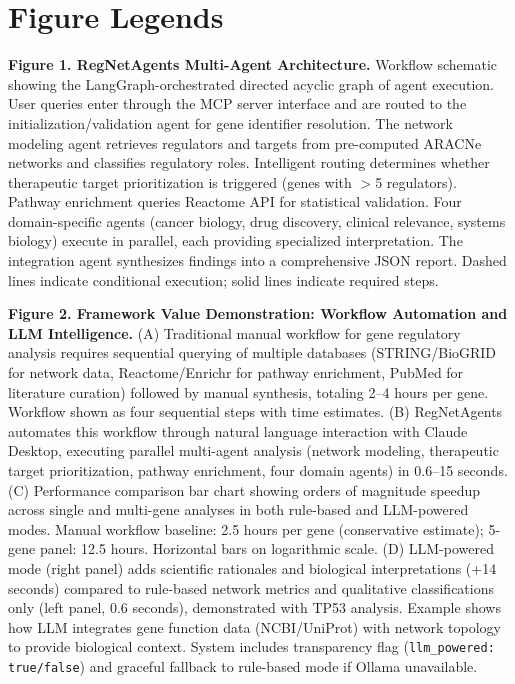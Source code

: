 \documentclass[11pt]{article}
\begin{document}
\section*{Figure Legends}

\textbf{Figure 1. RegNetAgents Multi-Agent Architecture.}
Workflow schematic showing the LangGraph-orchestrated directed acyclic graph of agent execution. User queries enter through the MCP server interface and are routed to the initialization/validation agent for gene identifier resolution. The network modeling agent retrieves regulators and targets from pre-computed ARACNe networks and classifies regulatory roles. Intelligent routing determines whether therapeutic target prioritization is triggered (genes with $>$5 regulators). Pathway enrichment queries Reactome API for statistical validation. Four domain-specific agents (cancer biology, drug discovery, clinical relevance, systems biology) execute in parallel, each providing specialized interpretation. The integration agent synthesizes findings into a comprehensive JSON report. Dashed lines indicate conditional execution; solid lines indicate required steps.

\textbf{Figure 2. Framework Value Demonstration: Workflow Automation and LLM Intelligence.}
(A) Traditional manual workflow for gene regulatory analysis requires sequential querying of multiple databases (STRING/BioGRID for network data, Reactome/Enrichr for pathway enrichment, PubMed for literature curation) followed by manual synthesis, totaling 2--4 hours per gene. Workflow shown as four sequential steps with time estimates. (B) RegNetAgents automates this workflow through natural language interaction with Claude Desktop, executing parallel multi-agent analysis (network modeling, therapeutic target prioritization, pathway enrichment, four domain agents) in 0.6--15 seconds. (C) Performance comparison bar chart showing orders of magnitude speedup across single and multi-gene analyses in both rule-based and LLM-powered modes. Manual workflow baseline: 2.5 hours per gene (conservative estimate); 5-gene panel: 12.5 hours. Horizontal bars on logarithmic scale. (D) LLM-powered mode (right panel) adds scientific rationales and biological interpretations (+14 seconds) compared to rule-based network metrics and qualitative classifications only (left panel, 0.6 seconds), demonstrated with TP53 analysis. Example shows how LLM integrates gene function data (NCBI/UniProt) with network topology to provide biological context. System includes transparency flag (\texttt{llm\_powered: true/false}) and graceful fallback to rule-based mode if Ollama unavailable.
\end{document}

